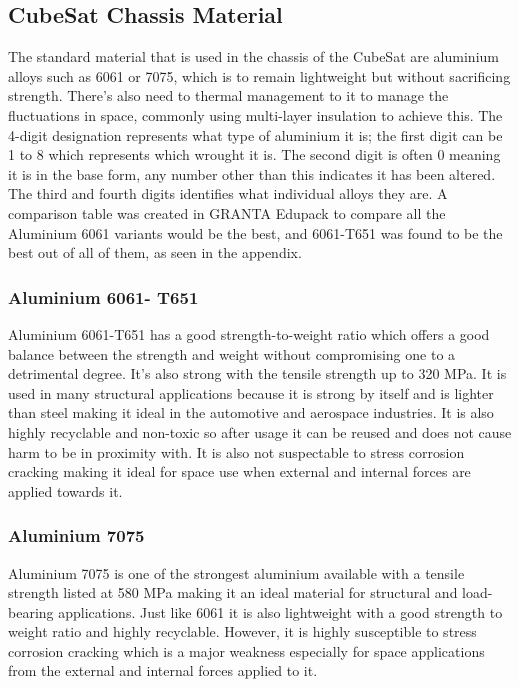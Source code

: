 \subsection{CubeSat Chassis Material} %
The standard material that is used in the chassis of the CubeSat are aluminium alloys such as 6061 or 7075, which is to remain lightweight but without sacrificing strength. 
There's also need to thermal management to it to manage the fluctuations in space, commonly using multi-layer insulation to achieve this. 
The 4-digit designation represents what type of aluminium it is; the first digit can be 1 to 8 which represents which wrought it is. 
The second digit is often 0 meaning it is in the base form, any number other than this indicates it has been altered. 
The third and fourth digits identifies what individual alloys they are. 
A comparison table was created in GRANTA Edupack to compare all the Aluminium 6061 variants would be the best, and 6061-T651 was found to be the best out of all of them, as seen in the appendix.

\subsubsection{Aluminium 6061- T651}
Aluminium 6061-T651 has a good strength-to-weight ratio which offers a good balance between the strength and weight without compromising one to a detrimental degree. 
It's also strong with the tensile strength up to 320 MPa. 
It is used in many structural applications because it is strong by itself and is lighter than steel making it ideal in the automotive and aerospace industries. 
It is also highly recyclable and non-toxic so after usage it can be reused and does not cause harm to be in proximity with. 
It is also not suspectable to stress corrosion cracking making it ideal for space use when external and internal forces are applied towards it.

\subsubsection{Aluminium 7075}
Aluminium 7075 is one of the strongest aluminium available with a tensile strength listed at 580 MPa making it an ideal material for structural and load-bearing applications. 
Just like 6061 it is also lightweight with a good strength to weight ratio and highly recyclable. 
However, it is highly susceptible to stress corrosion cracking which is a major weakness especially for space applications from the external and internal forces applied to it.

